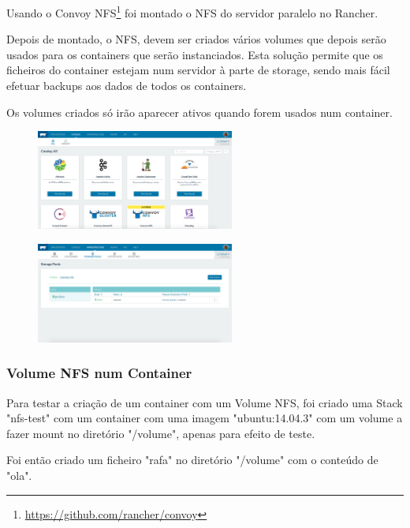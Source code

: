 \documentclass[pdftex,12pt,a4paper]{report}
\begin{document}
Usando o Convoy NFS\footnote{\label{url1} \url{https://github.com/rancher/convoy}} foi montado o NFS do servidor paralelo no Rancher. 

Depois de montado, o NFS, devem ser criados vários volumes que depois serão usados para os containers que serão instanciados. Esta solução permite que os ficheiros do container estejam num servidor à parte de storage, sendo mais fácil efetuar backups aos dados de todos os containers.

Os volumes criados só irão aparecer ativos quando forem usados num container.

\begin{figure}[!htb]
\centering
\begin{minipage}{.5\textwidth}
  \centering
  \includegraphics[width=65mm,scale=1]{imagens/catalog_all.png}
  \label{fig:catalog_all}
\end{minipage}%
\begin{minipage}{.5\textwidth}
  \centering
  \includegraphics[width=65mm,scale=1]{imagens/storage_pools_volumes.png}
  \label{fig:storage_pools_volumes}
\end{minipage}
\end{figure}

\subsubsection{Volume NFS num Container}

Para testar a criação de um container com um Volume NFS, foi criado uma Stack "nfs-test" com um container com uma imagem "ubuntu:14.04.3" com um volume a fazer mount no diretório "/volume", apenas para efeito de teste.

Foi então criado um ficheiro "rafa" no diretório "/volume" com o conteúdo de "ola". 
\newpage
\end{document}
